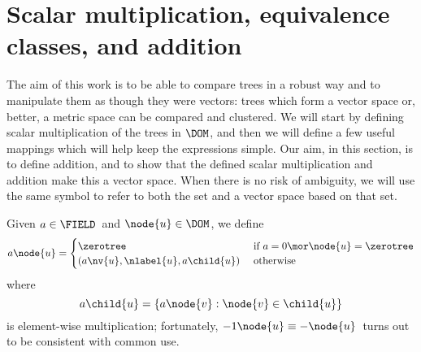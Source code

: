 
\section{Scalar multiplication, equivalence classes, and addition}

The aim of this work is to be able to compare trees in a robust way
and to manipulate them as though they were vectors: trees which form
a vector space or, better, a metric space can be compared and
clustered. We will start by defining scalar multiplication of the trees in
$\DOM$, and then we will define a few useful mappings which will help
keep the expressions simple. Our aim, in this section, is to define
addition, and to show that the defined scalar multiplication and
addition make this a vector space. When there is no risk of ambiguity,
we will use the same symbol to refer to both the set and
a vector space based on that set.

\begin{definition}\label{scalarmultiplication}
  Given $a \in \FIELD$\ and $\node{u} \in \DOM$, we
  define
  \begin{align*}
    a \node{u} = \begin{cases}
      \zerotree  & \text{ if } a = 0 \mor \node{u} = \zerotree \\
      (a \nv{u}, \nlabel{u}, a\child{u}) & \text{ otherwise }
    \end{cases}
  \end{align*}
  where \[a\child{u} = \{a \node{v}: \node{v}\in\child{u}\}\] is
  element-wise multiplication; fortunately,  $-1 \node{u} \equiv
  -\node{u}$\ turns out to be consistent with common use.
\end{definition}

